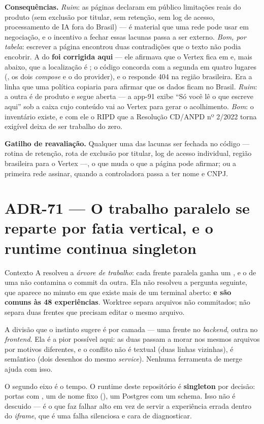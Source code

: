 \textbf{Consequências.} \emph{Ruim}: as páginas declaram em público limitações
reais do produto (sem exclusão por titular, sem retenção, sem log de acesso,
processamento de IA fora do Brasil) --- é material que uma rede pode usar em
negociação, e o incentivo a fechar essas lacunas passa a ser externo.
\emph{Bom, por tabela}: escrever a página encontrou duas contradições que o
texto não podia encobrir. A do  \textbf{foi corrigida
aqui} --- ele afirmava que o Vertex fica em  e, mais
abaixo, que a localização é ; o código concorda com a segunda em
quatro lugares (, os dois \emph{compose} e o
 do provider), e o  responde 404 na
região brasileira. Era a linha que uma política copiaria para afirmar que os
dados ficam no Brasil. \emph{Ruim}: a outra é de produto e segue aberta --- a
app-91 exibe \enquote{Só você lê o que escreve aqui} sob a caixa cujo conteúdo
vai ao Vertex para gerar o acolhimento. \emph{Bom}: o inventário existe, e com ele o RIPD que a Resolução
CD/ANPD nº 2/2022 torna exigível deixa de ser trabalho do zero.

\textbf{Gatilho de reavaliação.} Qualquer uma das lacunas ser fechada no código
--- rotina de retenção, rota de exclusão por titular, log de acesso individual,
região brasileira para o Vertex ---, o que muda o que a página pode afirmar; ou
a primeira rede assinar, quando a controladora passa a ter nome e CNPJ.

\section{ADR-71 --- O trabalho paralelo se reparte por fatia vertical, e o
runtime continua singleton}
\label{adr:fatia-vertical}

\begin{especificacao}{Contexto}
A  resolveu a \emph{árvore de trabalho}: cada frente paralela ganha
um , e o  de uma não contamina o commit da
outra. Ela não resolveu a pergunta seguinte, que aparece no minuto em que existe
mais de um terminal aberto: \textbf{ e  são comuns
às 48 experiências}. Worktree separa arquivos não commitados; não separa duas
frentes que precisam editar o mesmo arquivo.

A divisão que o instinto sugere é por camada --- uma frente no \emph{backend},
outra no \emph{frontend}. Ela é a pior possível aqui: as duas passam a morar nos
mesmos arquivos por motivos diferentes, e o conflito não é textual (duas linhas
vizinhas), é semântico (dois desenhos do mesmo \emph{service}). Nenhuma
ferramenta de merge ajuda com isso.

O segundo eixo é o tempo. O runtime deste repositório é \textbf{singleton} por
decisão: portas com , um  de nome fixo
(), um Postgres com um schema. Isso não é descuido --- é
o que faz  falhar alto em vez de servir a experiência errada dentro
do \emph{iframe}, que é uma falha silenciosa e cara de diagnosticar.
\end{especificacao}

